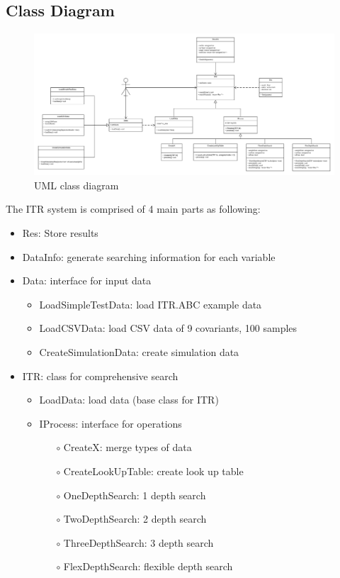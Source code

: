 \documentclass{article}
\begin{document}
\subsection{Class Diagram}
\begin{figure}[H]
\caption{UML class diagram}
\centering
\includegraphics[width=1\textwidth]{UML_Class.png}
\end{figure}

The ITR system is comprised of 4 main parts as following:
\begin{itemize}
\item Res: Store results
\item DataInfo: generate searching information for each variable
\item Data: interface for input data
\begin{itemize}
\item LoadSimpleTestData: load ITR.ABC example data
\item LoadCSVData: load CSV data of 9 covariants, 100 samples
\item CreateSimulationData: create simulation data 
\end{itemize}
\item ITR: class for comprehensive search
\begin{itemize}
\item LoadData: load data (base class for ITR)
\item IProcess: interface for operations
\begin{itemize}
\item[$\circ$] CreateX: merge types of data
\item[$\circ$] CreateLookUpTable: create look up table
\item[$\circ$] OneDepthSearch: 1 depth search
\item[$\circ$] TwoDepthSearch: 2 depth search
\item[$\circ$] ThreeDepthSearch: 3 depth search
\item[$\circ$] FlexDepthSearch: flexible depth search
\end{itemize}

\end{itemize}

\end{itemize}
\end{document}
